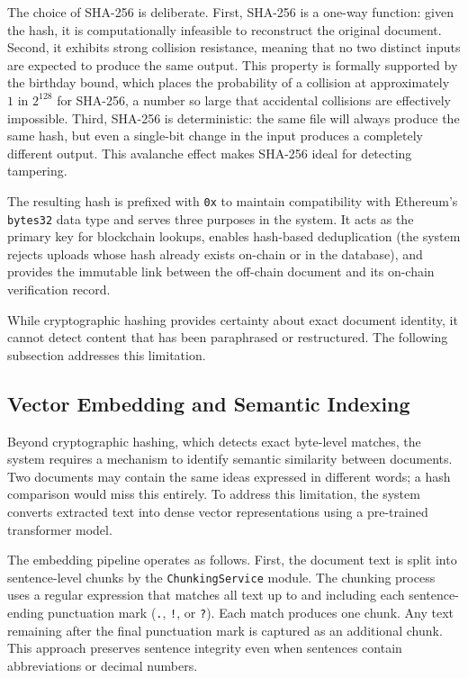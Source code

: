         The choice of SHA-256 is deliberate. First, SHA-256 is a one-way function: given the hash, it is computationally infeasible to reconstruct the original document. Second, it exhibits strong collision resistance, meaning that no two distinct inputs are expected to produce the same output. This property is formally supported by the birthday bound, which places the probability of a collision at approximately \(1 \text{ in } 2^{128}\) for SHA-256, a number so large that accidental collisions are effectively impossible. Third, SHA-256 is deterministic: the same file will always produce the same hash, but even a single-bit change in the input produces a completely different output. This avalanche effect makes SHA-256 ideal for detecting tampering.
        
        The resulting hash is prefixed with \texttt{0x} to maintain compatibility with Ethereum's \texttt{bytes32} data type and serves three purposes in the system. It acts as the primary key for blockchain lookups, enables hash-based deduplication (the system rejects uploads whose hash already exists on-chain or in the database), and provides the immutable link between the off-chain document and its on-chain verification record.
        
        While cryptographic hashing provides certainty about exact document identity, it cannot detect content that has been paraphrased or restructured. The following subsection addresses this limitation.

    \subsection{Vector Embedding and Semantic Indexing}
    \label{sec:vector_embedding}

        Beyond cryptographic hashing, which detects exact byte-level matches, the system requires a mechanism to identify semantic similarity between documents. Two documents may contain the same ideas expressed in different words; a hash comparison would miss this entirely. To address this limitation, the system converts extracted text into dense vector representations using a pre-trained transformer model.
        
        The embedding pipeline operates as follows. First, the document text is split into sentence-level chunks by the \texttt{ChunkingService} module. The chunking process uses a regular expression that matches all text up to and including each sentence-ending punctuation mark (\texttt{.}, \texttt{!}, or \texttt{?}). Each match produces one chunk. Any text remaining after the final punctuation mark is captured as an additional chunk. This approach preserves sentence integrity even when sentences contain abbreviations or decimal numbers.
        

